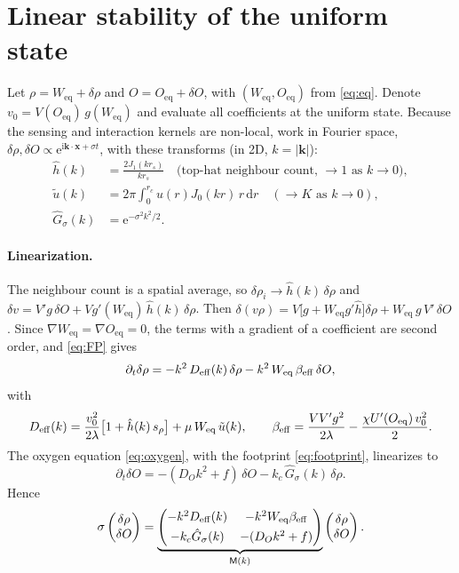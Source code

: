\documentclass[11pt,a4paper]{article}
\newcommand{\dd}{\mathrm{d}}
\newcommand{\ee}{\mathrm{e}}
\newcommand{\vect}[1]{\bm{#1}}
\newcommand{\Oeq}{O_{\mathrm{eq}}}
\newcommand{\Weq}{W_{\mathrm{eq}}}
\begin{document}
\section{Linear stability of the uniform state}
\label{sec:stab}

Let $\rho=\Weq+\delta\rho$ and $O=\Oeq+\delta O$, with $(\Weq,\Oeq)$ from \eqref{eq:eq}. Denote $v_0=V(\Oeq)\,g(\Weq)$ and evaluate all coefficients at the uniform state. Because the sensing and interaction kernels are non-local, work in Fourier space, $\delta\rho,\delta O\propto\ee^{\mathrm{i}\vect{k}\cdot\vect{x}+\sigma t}$, with these transforms (in 2D, $k=|\vect{k}|$):
\begin{align}
\hat h(k)&=\frac{2J_1(kr_s)}{kr_s}\quad\text{(top-hat neighbour count, }\to1\text{ as }k\to0),\nonumber\\
\tilde u(k)&=2\pi\!\int_0^{r_c}\!u(r)J_0(kr)\,r\,\dd r\quad(\to K\text{ as }k\to0),\nonumber\\
\hat G_\sigma(k)&=\ee^{-\sigma^2k^2/2}.
\end{align}

\paragraph{Linearization.}
The neighbour count is a spatial average, so $\delta\rho_i\to\hat h(k)\,\delta\rho$ and $\delta v=V'g\,\delta O+Vg'(\Weq)\,\hat h(k)\,\delta\rho$. Then $\delta(v\rho)=V\big[g+\Weq g'\hat h\big]\delta\rho+\Weq\,g\,V'\,\delta O$. Since $\nabla\Weq=\nabla\Oeq=0$, the terms with a gradient of a coefficient are second order, and \eqref{eq:FP} gives
\begin{equation}
\partial_t\delta\rho=-k^2\,D_{\rm eff}(k)\,\delta\rho-k^2\,\Weq\,\beta_{\rm eff}\,\delta O,
\end{equation}
with
\begin{equation}
D_{\rm eff}(k)=\frac{v_0^2}{2\lambda}\big[1+\hat h(k)\,s_\rho\big]+\mu\,\Weq\,\tilde u(k),
\qquad
\beta_{\rm eff}=\frac{V V' g^2}{2\lambda}-\frac{\chi U'(\Oeq)\,v_0^2}{2}.
\end{equation}
The oxygen equation \eqref{eq:oxygen}, with the footprint \eqref{eq:footprint}, linearizes to
\begin{equation}
\partial_t\delta O=-(D_Ok^2+f)\,\delta O-k_c\,\hat G_\sigma(k)\,\delta\rho .
\end{equation}
Hence
\begin{equation}
\sigma\begin{pmatrix}\delta\rho\\\delta O\end{pmatrix}=
\underbrace{\begin{pmatrix}-k^2D_{\rm eff}(k) & -k^2\Weq\beta_{\rm eff}\\[3pt] -k_c\hat G_\sigma(k) & -(D_Ok^2+f)\end{pmatrix}}_{\mathsf{M}(k)}
\begin{pmatrix}\delta\rho\\\delta O\end{pmatrix}.
\end{equation}
\end{document}
